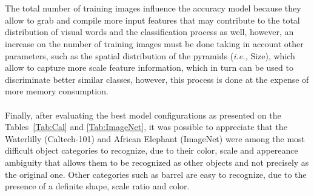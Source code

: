 \documentclass[10pt,twocolumn,letterpaper]{article}
\begin{document}
\\
\\
The total number of training images influence the accuracy model because they allow to grab and compile more input features that may contribute to the total distribution of visual words and the classification process as well, however, an increase on the number of training images must be done taking in account other parameters, such as the spatial distribution of the pyramids (\textit{i.e.,} Size), which allow to capture more scale feature information, which in turn can be used to discriminate better similar classes, however, this process is done at the expense of more memory consumption.
\\
\\
Finally, after evaluating the best model configurations as presented on the Tables~\ref{Tab:Cal} and \ref{Tab:ImageNet}, it was possible to appreciate that the Waterlilly (Caltech-101) and African Elephant (ImageNet) were among the most difficult object categories to recognize, due to their color, scale and appereance ambiguity that allows them to be recognized as other objects and not precisely as the original one. Other categories such as barrel are easy to recognize, due to the presence of a definite shape, scale ratio and color.
\end{document}
